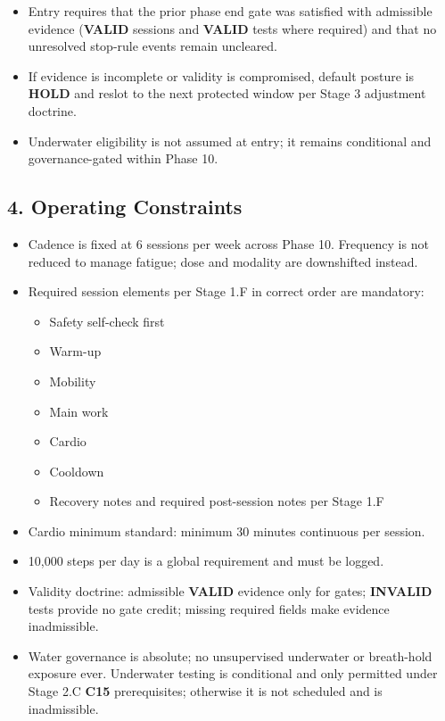 \documentclass[10pt]{article}
\begin{document}
\begin{itemize}
\item Entry requires that the prior phase end gate was satisfied with admissible evidence (\textbf{VALID} sessions and \textbf{VALID} tests where required) and that no unresolved stop-rule events remain uncleared.
\item If evidence is incomplete or validity is compromised, default posture is \textbf{HOLD} and reslot to the next protected window per Stage 3 adjustment doctrine.
\item Underwater eligibility is not assumed at entry; it remains conditional and governance-gated within Phase 10.
\end{itemize}

\subsection*{4. Operating Constraints}

\begin{itemize}
\item Cadence is fixed at 6 sessions per week across Phase 10. Frequency is not reduced to manage fatigue; dose and modality are downshifted instead.
\item Required session elements per Stage 1.F in correct order are mandatory:
  \begin{itemize}
  \item Safety self-check first
  \item Warm-up
  \item Mobility
  \item Main work
  \item Cardio
  \item Cooldown
  \item Recovery notes and required post-session notes per Stage 1.F
  \end{itemize}
\item Cardio minimum standard: minimum 30 minutes continuous per session.
\item 10,000 steps per day is a global requirement and must be logged.
\item Validity doctrine: admissible \textbf{VALID} evidence only for gates; \textbf{INVALID} tests provide no gate credit; missing required fields make evidence inadmissible.
\item Water governance is absolute; no unsupervised underwater or breath-hold exposure ever. Underwater testing is conditional and only permitted under Stage 2.C \textbf{C15} prerequisites; otherwise it is not scheduled and is inadmissible.
\end{itemize}
\end{document}
